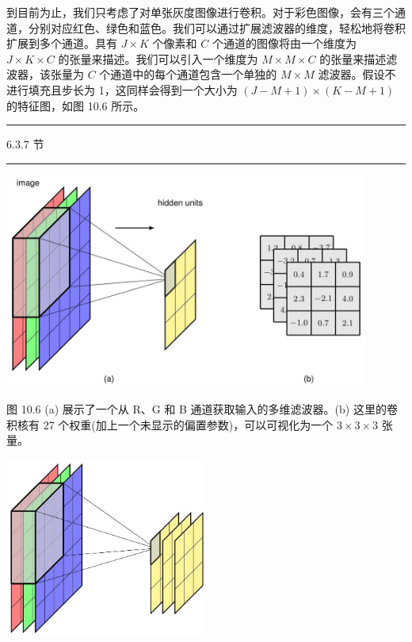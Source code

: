 \documentclass[10pt]{article}
\newcommand{\HRule}{\begin{center}\rule{0.9\linewidth}{0.2mm}\end{center}}
\begin{document}
到目前为止，我们只考虑了对单张灰度图像进行卷积。对于彩色图像，会有三个通道，分别对应红色、绿色和蓝色。我们可以通过扩展滤波器的维度，轻松地将卷积扩展到多个通道。具有 \(J \times  K\) 个像素和 \(C\) 个通道的图像将由一个维度为 \(J \times  K \times  C\) 的张量来描述。我们可以引入一个维度为 \(M \times  M \times  C\) 的张量来描述滤波器，该张量为 \(C\) 个通道中的每个通道包含一个单独的 \(M \times  M\) 滤波器。假设不进行填充且步长为 1，这同样会得到一个大小为 \(\left( {J - M + 1}\right)  \times  \left( {K - M + 1}\right)\) 的特征图，如图 10.6 所示。

\HRule

6.3.7 节

\HRule

\begin{center}
\includegraphics[max width=0.9\textwidth]{images/0194e279-9b28-703a-88f4-c3ac21e2010d_314_236_1176_1170_688_0.jpg}
\end{center}
\hspace*{3em} 

图 10.6 (a) 展示了一个从 R、G 和 B 通道获取输入的多维滤波器。(b) 这里的卷积核有 27 个权重(加上一个未显示的偏置参数)，可以可视化为一个 \(3 \times  3 \times  3\) 张量。

\begin{center}
\includegraphics[max width=0.5\textwidth]{images/0194e279-9b28-703a-88f4-c3ac21e2010d_315_847_341_709_625_0.jpg}
\end{center}
\hspace*{3em} 
\end{document}
